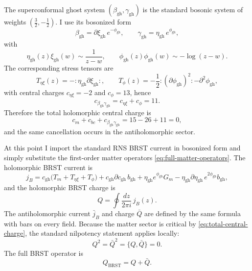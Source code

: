 \documentclass[11pt]{article}
\newcommand{\gh}{\mathrm{gh}}
\begin{document}
The superconformal ghost system $(\beta_{\gh},\gamma_{\gh})$ is the standard bosonic system of weights $(\tfrac32,-\tfrac12)$. I use its bosonized form
\begin{equation}\label{eq:superghost-bosonization}
\beta_{\gh}=\partial\xi_{\gh}\,e^{-\phi_{\gh}},
\qquad
\gamma_{\gh}=\eta_{\gh}\,e^{\phi_{\gh}},
\end{equation}
with
\begin{equation}\label{eq:bosonized-opes}
\eta_{\gh}(z)\xi_{\gh}(w)\sim \frac{1}{z-w},
\qquad
\phi_{\gh}(z)\phi_{\gh}(w)\sim -\log(z-w).
\end{equation}
The corresponding stress tensors are
\begin{equation}\label{eq:eta-xi-stress}
T_{\eta\xi}(z)=-:\!\eta_{\gh}\partial\xi_{\gh}\!:,
\qquad
T_{\phi}(z)=-\frac12:\!(\partial\phi_{\gh})^2\!:-\partial^2\phi_{\gh},
\end{equation}
with central charges $c_{\eta\xi}=-2$ and $c_{\phi}=13$, hence
\begin{equation}\label{eq:superghost-central-charge}
c_{\beta_{\gh}\gamma_{\gh}}=c_{\eta\xi}+c_{\phi}=11.
\end{equation}
Therefore the total holomorphic central charge is
\begin{equation}\label{eq:total-central-charge}
c_m+c_{bc}+c_{\beta_{\gh}\gamma_{\gh}}=15-26+11=0,
\end{equation}
and the same cancellation occurs in the antiholomorphic sector.

At this point I import the standard RNS BRST current in bosonized form and simply substitute the first-order matter operators \eqref{eq:full-matter-operators}. The holomorphic BRST current is
\begin{equation}\label{eq:brst-current}
j_B
=
c_{\gh}\bigl(T_m+T_{\eta\xi}+T_\phi\bigr)
+c_{\gh}\partial c_{\gh}\,b_{\gh}
+\eta_{\gh}e^{\phi_{\gh}}G_m
-\eta_{\gh}\partial\eta_{\gh}\,e^{2\phi_{\gh}}b_{\gh},
\end{equation}
and the holomorphic BRST charge is
\begin{equation}\label{eq:holomorphic-brst}
Q=\oint \frac{dz}{2\pi i}\,j_B(z).
\end{equation}
The antiholomorphic current $\bar j_B$ and charge $\bar Q$ are defined by the same formula with bars on every field. Because the matter sector is critical by \eqref{eq:total-central-charge}, the standard nilpotency statement applies locally:
\begin{equation}\label{eq:nilpotency}
Q^2=\bar Q^2=\{Q,\bar Q\}=0.
\end{equation}
The full BRST operator is
\begin{equation}\label{eq:full-brst}
Q_{\mathrm{BRST}}=Q+\bar Q.
\end{equation}
\end{document}
